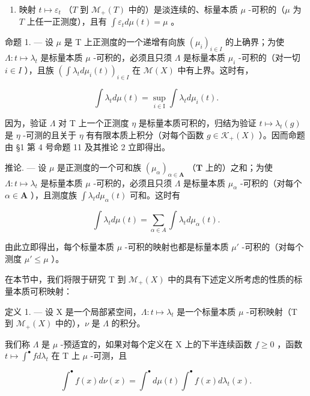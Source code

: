 \begin{enumerate}
\def\labelenumi{\arabic{enumi})}
\setcounter{enumi}{1}
\tightlist
\item
  映射 \(t \mapsto \varepsilon_t\) （\(T\) 到 \(\mathcal{M}_+(T)\) 中的）是淡连续的、标量本质 \(\mu\) -可积的（\(\mu\) 为 \(T\) 上任一正测度），且有 \(\int \varepsilon_t d\mu(t) = \mu\) 。
\end{enumerate}

命题 1. --- 设 \(\mu\) 是 T 上正测度的一个递增有向族 \((\mu_i)_{i \in I}\) 的上确界；为使 \(\Lambda : t \mapsto \lambda_t\) 是标量本质 \(\mu\) -可积的，必须且只须 \(\Lambda\) 是标量本质 \(\mu_i\) -可积的（对一切 \(i \in I\) ），且族 \(\left( \int \lambda_t d\mu_i(t) \right)_{i \in I}\) 在 \(\mathcal{M}(X)\) 中有上界。这时有，

\[
\int \lambda_ {t} d \mu (t) = \sup _ {i \in \mathrm{I}} \int \lambda_ {t} d \mu_ {i} (t).\tag{2}
\]

因为，验证 \(\Lambda\) 对 T 上一个正测度 \(\eta\) 是标量本质可积的，归结为验证 \(t \mapsto \lambda_{t}(g)\) 是 \(\eta\) -可测的且关于 \(\eta\) 有有限本质上积分（对每个函数 \(g \in \mathcal{K}_{+}(X)\) ）。因而命题由 §1 第 4 号命题 11 及其推论 2 立即得出。

推论. --- 设 \(\mu\) 是正测度的一个可和族 \((\mu_{\alpha})_{\alpha \in \mathbf{A}}\) （\(\mathbf{T}\) 上的）之和；为使 \(\Lambda : t \mapsto \lambda_t\) 是标量本质 \(\mu\) -可积的，必须且只须 \(\Lambda\) 是标量本质 \(\mu_{\alpha}\) -可积的（对每个 \(\alpha \in \mathbf{A}\) ），且测度族 \(\int \lambda_t d\mu_{\alpha}(t)\) 可和。这时有

\[
\int \lambda_ {t} d \mu (t) = \sum_ {\alpha \in A} \int \lambda_ {t} d \mu_ {\alpha} (t).\tag{3}
\]

由此立即得出，每个标量本质 \(\mu\) -可积的映射也都是标量本质 \(\mu'\) -可积的（对每个测度 \(\mu' \leqslant \mu\) ）。

在本节中，我们将限于研究 T 到 \(\mathcal{M}_{+}(X)\) 中的具有下述定义所考虑的性质的标量本质可积映射：

定义 1. --- 设 X 是一个局部紧空间，\(\Lambda : t \mapsto \lambda_t\) 是一个标量本质 \(\mu\) -可积映射（T 到 \(\mathcal{M}_{+}(X)\) 中的），\(\nu\) 是 \(\Lambda\) 的积分。

我们称 \(\Lambda\) 是 \(\mu\) -预适宜的，如果对每个定义在 X 上的下半连续函数 \(f \geqslant 0\) ，函数 \(t \mapsto \int^{\bullet} f d\lambda_t\) 在 T 上 \(\mu\) -可测，且

\[
\int^ {\bullet} f (x) d \nu (x) = \int^ {\bullet} d \mu (t) \int^ {\bullet} f (x) d \lambda_ {t} (x).\tag{4}
\]

